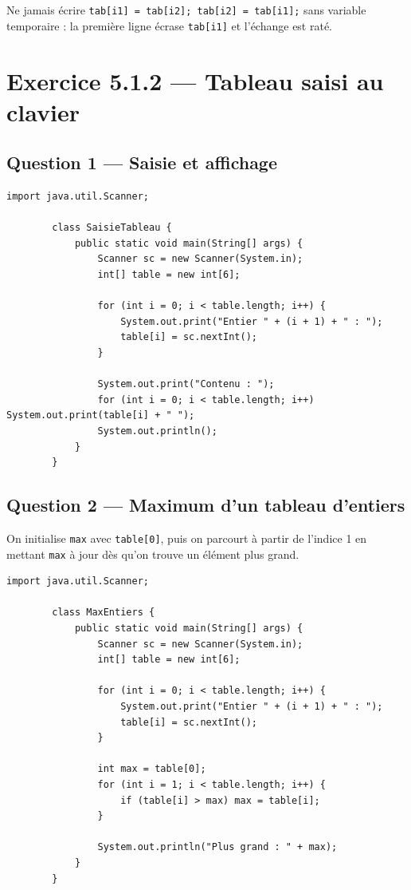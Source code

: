 \documentclass[12pt,a4paper]{article}
\begin{document}
	\begin{boiteErreur}
		Ne jamais écrire \texttt{tab[i1] = tab[i2]; tab[i2] = tab[i1];} sans variable
		temporaire : la première ligne écrase \texttt{tab[i1]} et l'échange est raté.
	\end{boiteErreur}
	
	\newpage
	\section*{Exercice 5.1.2 — Tableau saisi au clavier}
	
	\subsection*{Question 1 — Saisie et affichage}
	
	\begin{lstlisting}[style=java, caption={Q1 — Saisie et affichage}]
		import java.util.Scanner;
		
		class SaisieTableau {
			public static void main(String[] args) {
				Scanner sc = new Scanner(System.in);
				int[] table = new int[6];
				
				for (int i = 0; i < table.length; i++) {
					System.out.print("Entier " + (i + 1) + " : ");
					table[i] = sc.nextInt();
				}
				
				System.out.print("Contenu : ");
				for (int i = 0; i < table.length; i++) System.out.print(table[i] + " ");
				System.out.println();
			}
		}
	\end{lstlisting}
	
	\subsection*{Question 2 — Maximum d'un tableau d'entiers}
	
	\begin{boiteRaisonnement}
		On initialise \texttt{max} avec \texttt{table[0]}, puis on parcourt à partir de
		l'indice 1 en mettant \texttt{max} à jour dès qu'on trouve un élément plus grand.
	\end{boiteRaisonnement}
	
	\begin{lstlisting}[style=java, caption={Q2 — Plus grand entier}]
		import java.util.Scanner;
		
		class MaxEntiers {
			public static void main(String[] args) {
				Scanner sc = new Scanner(System.in);
				int[] table = new int[6];
				
				for (int i = 0; i < table.length; i++) {
					System.out.print("Entier " + (i + 1) + " : ");
					table[i] = sc.nextInt();
				}
				
				int max = table[0];
				for (int i = 1; i < table.length; i++) {
					if (table[i] > max) max = table[i];
				}
				
				System.out.println("Plus grand : " + max);
			}
		}
	\end{lstlisting}
	
\end{document}
